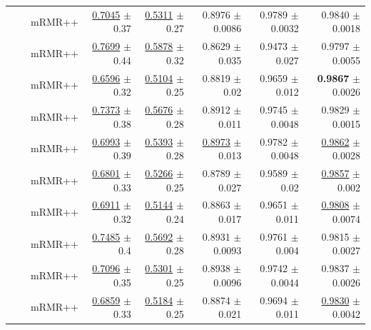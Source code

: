 \begin{longtable}{llp{}rrrrr}
 &  & mRMR++ & \underline{0.7045} {\scriptsize $\pm$ 0.37} & \underline{0.5311} {\scriptsize $\pm$ 0.27} & 0.8976 {\scriptsize $\pm$ 0.0086} & 0.9789 {\scriptsize $\pm$ 0.0032} & 0.9840 {\scriptsize $\pm$ 0.0018} \\
 &  & mRMR++ & \underline{0.7699} {\scriptsize $\pm$ 0.44} & \underline{0.5878} {\scriptsize $\pm$ 0.32} & 0.8629 {\scriptsize $\pm$ 0.035} & 0.9473 {\scriptsize $\pm$ 0.027} & 0.9797 {\scriptsize $\pm$ 0.0055} \\
 &  & mRMR++ & \underline{0.6596} {\scriptsize $\pm$ 0.32} & \underline{0.5104} {\scriptsize $\pm$ 0.25} & 0.8819 {\scriptsize $\pm$ 0.02} & 0.9659 {\scriptsize $\pm$ 0.012} & \textbf{0.9867} {\scriptsize $\pm$ 0.0026} \\
 &  & mRMR++ & \underline{0.7373} {\scriptsize $\pm$ 0.38} & \underline{0.5676} {\scriptsize $\pm$ 0.28} & 0.8912 {\scriptsize $\pm$ 0.011} & 0.9745 {\scriptsize $\pm$ 0.0048} & 0.9829 {\scriptsize $\pm$ 0.0015} \\
 &  & mRMR++ & \underline{0.6993} {\scriptsize $\pm$ 0.39} & \underline{0.5393} {\scriptsize $\pm$ 0.28} & \underline{0.8973} {\scriptsize $\pm$ 0.013} & 0.9782 {\scriptsize $\pm$ 0.0048} & \underline{0.9862} {\scriptsize $\pm$ 0.0028} \\
 &  & mRMR++ & \underline{0.6801} {\scriptsize $\pm$ 0.33} & \underline{0.5266} {\scriptsize $\pm$ 0.25} & 0.8789 {\scriptsize $\pm$ 0.027} & 0.9589 {\scriptsize $\pm$ 0.02} & \underline{0.9857} {\scriptsize $\pm$ 0.002} \\
 &  & mRMR++ & \underline{0.6911} {\scriptsize $\pm$ 0.32} & \underline{0.5144} {\scriptsize $\pm$ 0.24} & 0.8863 {\scriptsize $\pm$ 0.017} & 0.9651 {\scriptsize $\pm$ 0.011} & \underline{0.9808} {\scriptsize $\pm$ 0.0074} \\
 &  & mRMR++ & \underline{0.7485} {\scriptsize $\pm$ 0.4} & \underline{0.5692} {\scriptsize $\pm$ 0.28} & 0.8931 {\scriptsize $\pm$ 0.0093} & 0.9761 {\scriptsize $\pm$ 0.004} & 0.9815 {\scriptsize $\pm$ 0.0027} \\
 &  & mRMR++ & \underline{0.7096} {\scriptsize $\pm$ 0.35} & \underline{0.5301} {\scriptsize $\pm$ 0.25} & 0.8938 {\scriptsize $\pm$ 0.0096} & 0.9742 {\scriptsize $\pm$ 0.0044} & 0.9837 {\scriptsize $\pm$ 0.0026} \\
 &  & mRMR++ & \underline{0.6859} {\scriptsize $\pm$ 0.33} & \underline{0.5184} {\scriptsize $\pm$ 0.25} & 0.8874 {\scriptsize $\pm$ 0.021} & 0.9694 {\scriptsize $\pm$ 0.011} & \underline{0.9830} {\scriptsize $\pm$ 0.0042} \\

\end{longtable}
